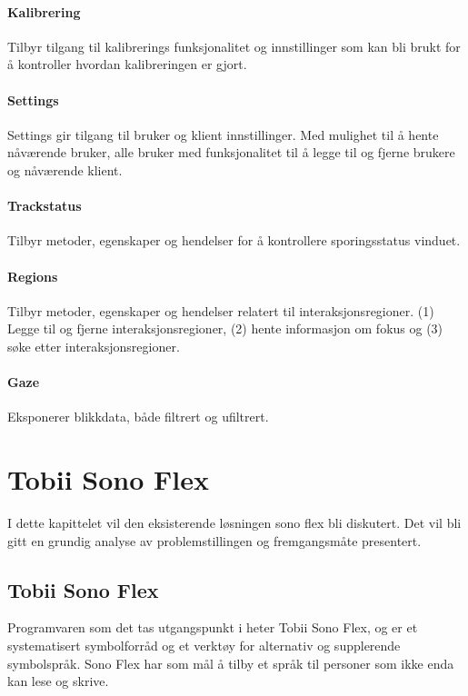 \documentclass[phd,tocprelim]{cornell}
\begin{document}
\subsubsection{Kalibrering}
Tilbyr tilgang til kalibrerings funksjonalitet og innstillinger som kan bli brukt for å kontroller hvordan kalibreringen er gjort.

\subsubsection{Settings}
Settings gir tilgang til bruker og klient innstillinger. Med mulighet til å hente nåværende bruker, alle bruker med funksjonalitet til å legge til og fjerne brukere og nåværende klient.

\subsubsection{Trackstatus}
Tilbyr metoder, egenskaper og hendelser for å kontrollere sporingsstatus vinduet. 


\subsubsection{Regions}
Tilbyr metoder, egenskaper og hendelser relatert til interaksjonsregioner. (1) Legge til og fjerne interaksjonsregioner, (2) hente informasjon om fokus og (3) søke etter interaksjonsregioner.

\subsubsection{Gaze}
Eksponerer blikkdata, både filtrert og ufiltrert. 


\chapter{Tobii Sono Flex}

I dette kapittelet vil den eksisterende løsningen sono flex bli diskutert. Det vil bli gitt en grundig analyse av problemstillingen og fremgangsmåte presentert.


\section{Tobii Sono Flex}
\label{chap:Tobii-Sono-Flex}


Programvaren som det tas utgangspunkt i heter Tobii Sono Flex,  og er et systematisert symbolforråd og et verktøy for alternativ og supplerende symbolspråk. Sono Flex har som mål å tilby et språk til personer som ikke enda kan lese og skrive. 
\end{document}
